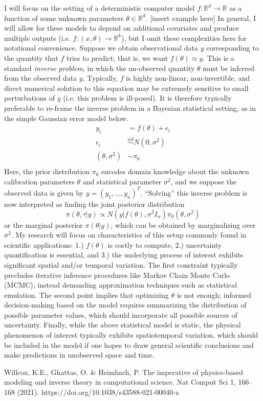 \documentclass[12pt]{article}
\newcommand{\R}{\mathcal{R}}
\def\R{\mathbb{R}}
\begin{document}
I will focus on the setting of a deterministic computer model $f: \R^d \to \R$ as a function of some unknown parameters $\theta \in \R^d$. [insert example here] In general, I will allow
for these models to depend on additional covariates and produce multiple outputs (i.e. $f: (x, \theta) \to \R^k$), but I omit these complexities here for notational convenience. Suppose 
we obtain observational data $y$ corresponding to the quantity that $f$ tries to predict; that is, we want $f(\theta) \approx y$. This is a standard \textit{inverse problem}, in which
the un-observed quantity $\theta$ must be inferred from the observed data $y$. Typically, $f$ is highly non-linear, non-invertible, and direct numerical solution to this equation may be extremely sensitive
to small perturbations of $y$ (i.e. this problem is ill-posed). It is therefore typically preferable to re-frame the inverse problem in a Bayesian statistical setting, as in the simple Gaussian error model below. 
\begin{align*}
y_i &= f(\theta) + \epsilon_i \\
\epsilon_i &\overset{iid}{\sim} N(0, \sigma^2) \\
(\theta, \sigma^2) &\sim \pi_0 \\
\end{align*}
Here, the prior distribution $\pi_0$ encodes domain knowledge about the unknown calibration parameters $\theta$ and statistical parameter $\sigma^2$, and we suppose the observed data is given by 
$y = (y_1, \dots, y_n)^T$. ``Solving'' this inverse problem is now interpreted as finding the joint posterior distribution
\[\pi(\theta, \tau|y) \propto N(y|f(\theta), \sigma^2 I_n)\pi_0(\theta, \sigma^2)\]
or the marginal posterior $\pi(\theta|y)$, which can be obtained by marginalizing over $\sigma^2$. My research will focus on characteristics of this setup commonly found in scientific applications: 1.) $f(\theta)$ is
costly to compute, 2.) uncertainty quantification is essential, and 3.) the underlying process of interest exhibits significant spatial and/or temporal variation. The first constraint typically precludes iterative inference 
procedures like Markov Chain Monte Carlo (MCMC), instead demanding approximation techniques such as statistical emulation. The second point implies that optimizing $\theta$ is not enough; informed 
decision-making based on the model requires summarizing the distribution of possible parameter values, which should incorporate all possible sources of uncertainty. Finally, while the above statistical model
is static, the physical phenomenon of interest typically exhibits spatiotemporal variation, which should be included in the model if one hopes to draw general scientific conclusions and make predictions 
in unobserved space and time. 

 



\begin{thebibliography}{20}
 Willcox, K.E., Ghattas, O. \& Heimbach, P. The imperative of physics-based modeling and inverse theory in computational science. Nat Comput Sci 1, 166–168 (2021). https://doi.org/10.1038/s43588-021-00040-z
\end{thebibliography}
\end{document}
